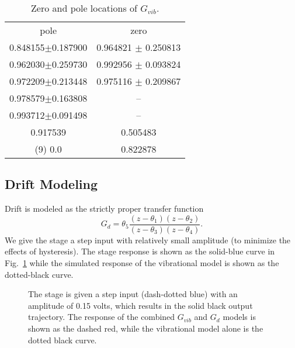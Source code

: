 \documentclass[journal,twocolumn,twoside]{IEEEtran}
\begin{document}
\begin{table}
  \centering
  \caption{Zero and pole locations of $G_{vib}$. }
  \label{tab:pzgvib}
  \begin{tabular}{cc}
    pole & zero\\
    0.848155$\pm$0.187900 & 0.964821 $\pm$ 0.250813\\ 
    0.962030$\pm$0.259730 & 0.992956 $\pm$ 0.093824\\ 
    0.972209$\pm$0.213448 & 0.975116 $\pm$ 0.209867\\ 
    0.978579$\pm$0.163808 & --\\ 
    0.993712$\pm$0.091498 & --\\ 
    0.917539 & 0.505483 \\ 
    (9) 0.0 & 0.822878 \\ 
  \end{tabular}
\end{table}


\subsection{Drift Modeling}\label{sec:drift_model}




Drift is modeled as the strictly proper transfer function
\begin{equation}
G_d = \theta_5\frac{(z-\theta_1)(z-\theta_2)}{(z-\theta_3)(z-\theta_4)}.
\end{equation}
We give the stage a step input with relatively small amplitude (to minimize the effects of hysteresis). The stage response is shown as the solid-blue curve in Fig.~\ref{fig:drift_fit} while the simulated response of the vibrational model is shown as the dotted-black curve. 

\begin{figure}
  
  \caption{The stage is given a step input (dash-dotted blue) with an amplitude of 0.15 volts, which results in the solid black output trajectory. The response of the combined $G_{vib}$ and $G_{d}$ models is shown as the dashed red, while the vibrational model alone is the dotted black curve.}
  \label{fig:drift_fit}
\end{figure}
\end{document}
